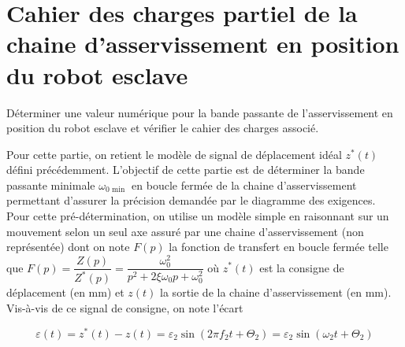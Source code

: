 
%


\section{Cahier des charges partiel de la chaine d'asservissement en position du robot esclave}
\begin{obj}
Déterminer une valeur numérique pour la bande passante de l'asservissement en position du robot esclave et vérifier le cahier des charges associé.
\end{obj}

\ifprof
\else
Pour cette partie, on retient le modèle de signal de déplacement idéal $z^{*}(t)$ défini précédemment. L'objectif de cette partie est de déterminer la bande passante minimale $\omega_{0 \text { min }}$ en boucle fermée de la chaine d'asservissement permettant d'assurer la précision demandée par le diagramme des exigences.\\
Pour cette pré-détermination, on utilise un modèle simple en raisonnant sur un mouvement selon un seul axe assuré par une chaine d'asservissement (non représentée) dont on note $F(p)$ la fonction de transfert en boucle fermée telle que $F(p)=\dfrac{Z(p)}{Z^{*}(p)}=\dfrac{\omega_{0}^{2}}{p^{2}+2 \xi \omega_{0} p+\omega_{0}^{2}}$ où $z^{*}(t)$ est la consigne de déplacement (en mm) et $z(t)$ la sortie de la chaine d'asservissement (en mm). Vis-à-vis de ce signal de consigne, on note l'écart

$$
\varepsilon(t)=z^{*}(t)-z(t)=\varepsilon_{2} \sin \left(2 \pi f_{2} t+\Theta_{2}\right)=\varepsilon_{2} \sin \left(\omega_{2} t+\Theta_{2}\right)
$$
\fi


